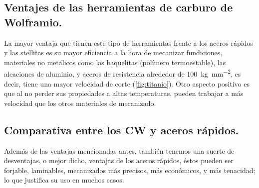 \documentclass[12pt,a4paper]{article}
\begin{document}
\subsection{Ventajes de las herramientas de carburo de Wolframio.}

La mayor ventaja que tienen este tipo de herramientas frente a los aceros rápidos y las stellitas es su mayor eficiencia a la hora de mecanizar fundiciones, materiales no metálicos como las baquelitas (polímero termoestable), las aleaciones de aluminio, y aceros de resistencia alrededor de \SI{100}{\kilo\gram\per\milli\meter\squared}, es decir, tiene una mayor velocidad de corte (\autoref{fig:titanio}). Otro aspecto positivo es que al no perder sus propiedades a altas temperaturas, pueden trabajar a más velocidad que los otros materiales de mecanizado.

\subsection{Comparativa entre los CW y aceros rápidos.}

Además de las ventajas mencionadas antes, también tenemos una suerte de desventajas, o mejor dicho, ventajas de los aceros rápidos, éstos pueden ser forjable, laminables, mecanizados más precisos, más económicos, y más tenacidad; lo que justifica su uso en muchos casos.
\end{document}
